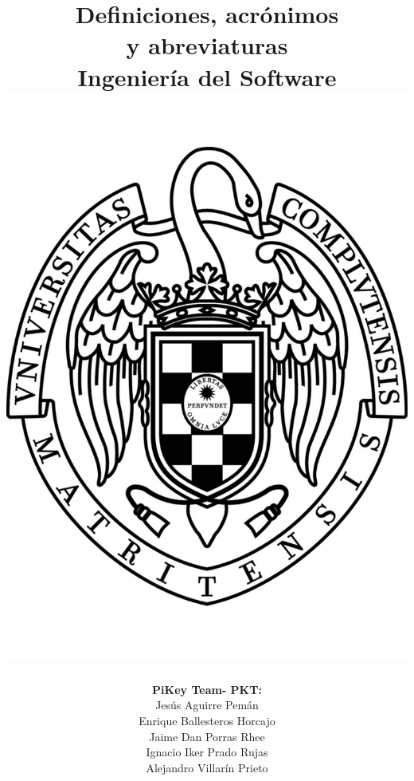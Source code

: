 \documentclass[spanish,a4paper,11pt, twoside]{report}	%
\begin{document}
\title{\textbf{\huge{Definiciones, acrónimos \\ 
	y abreviaturas}} \\ \vspace{0.3cm}
	\Large{Ingeniería del Software} \\
	\includegraphics[scale=0.3]{ucm.pdf}}
\author{ \textbf{\Large{PiKey Team- PKT:}} \vspace{0.2cm} \\
	Jesús Aguirre Pemán \\
	 Enrique Ballesteros Horcajo \\
	 Jaime Dan Porras Rhee \\
	 Ignacio Iker Prado Rujas \\
	 Alejandro Villarín Prieto }
\date{\Today}
\maketitle
\end{document}
